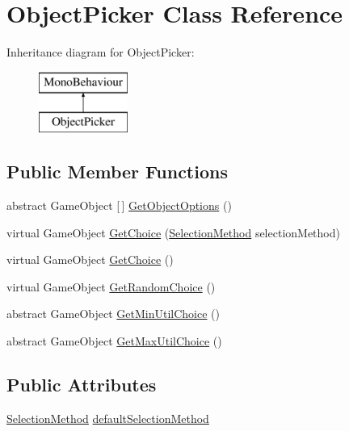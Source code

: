 \hypertarget{class_object_picker}{}\section{Object\+Picker Class Reference}
\label{class_object_picker}
Inheritance diagram for Object\+Picker\+:\begin{figure}[H]
\begin{center}
\leavevmode
\includegraphics[height=2.000000cm]{class_object_picker}
\end{center}
\end{figure}
\subsection*{Public Member Functions}
\begin{DoxyCompactItemize}
\item 
abstract Game\+Object \mbox{[}$\,$\mbox{]} \mbox{\hyperlink{class_object_picker_a637528ecd5f6814b693809aa01c73d0d}{Get\+Object\+Options}} ()
\item 
virtual Game\+Object \mbox{\hyperlink{class_object_picker_af46555e63096c06e8148294c71d29ae0}{Get\+Choice}} (\mbox{\hyperlink{_object_picker_8cs_a2dcef18caa6de91171bf235b9189206d}{Selection\+Method}} selection\+Method)
\item 
virtual Game\+Object \mbox{\hyperlink{class_object_picker_ae93cde0e42852dcbe39015206c70cfd5}{Get\+Choice}} ()
\item 
virtual Game\+Object \mbox{\hyperlink{class_object_picker_a50bda66bcb02e806964805423327d6d7}{Get\+Random\+Choice}} ()
\item 
abstract Game\+Object \mbox{\hyperlink{class_object_picker_aeb1c11e83af3c5e6b76a431af437ff40}{Get\+Min\+Util\+Choice}} ()
\item 
abstract Game\+Object \mbox{\hyperlink{class_object_picker_a22f1eaaa6cc1c7b545f0fb5c369fc445}{Get\+Max\+Util\+Choice}} ()
\end{DoxyCompactItemize}
\subsection*{Public Attributes}
\begin{DoxyCompactItemize}
\item 
\mbox{\hyperlink{_object_picker_8cs_a2dcef18caa6de91171bf235b9189206d}{Selection\+Method}} \mbox{\hyperlink{class_object_picker_a111abafc332a892a7155c876329e08f3}{default\+Selection\+Method}}
\end{DoxyCompactItemize}


